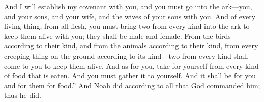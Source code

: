 \begin{biblechapter}
\verse And I will establish my covenant with you, and you must go into the ark—you, and your sons, and your wife, and the wives of your sons with you.
\verse And of every living thing, from all flesh, you must bring two from every kind into the ark to keep them alive with you; they shall be male and female.
\verse From the birds according to their kind, and from the animals according to their kind, from every creeping thing on the ground according to its kind—two from every kind shall come to you to keep them alive.
\verse And as for you, take for yourself from every kind of food that is eaten. And you must gather it to yourself. And it shall be for you and for them for food.”
\verse And Noah did according to all that God commanded him; thus he did.
\end{biblechapter}

